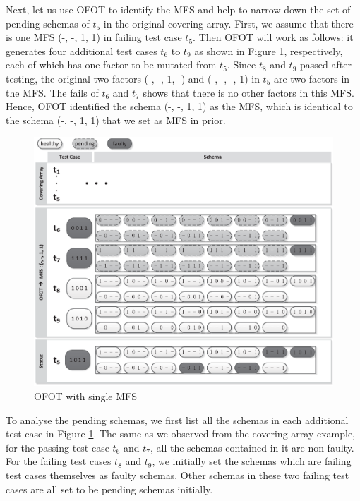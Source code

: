 Next, let us use OFOT to identify the MFS and help to narrow down the set of pending schemas of $t_{5}$ in the original covering array. First, we assume that there is one MFS (-, -, 1, 1) in failing test case $t_{5}$.  Then OFOT will work as follows: it generates four additional test cases $t_{6}$ to $t_{9}$ as shown in Figure \ref{fig_ofot_single}, respectively, each of which has one factor to be mutated from $t_{5}$.  Since $t_{8}$ and $t_{9}$ passed after testing, the original two factors (-, -, 1, -) and (-, -, -, 1) in $t_{5}$ are two factors in the MFS. The fails of $t_{6}$ and $t_{7}$ shows that there is no other factors in this MFS. Hence, OFOT identified the schema (-, -, 1, 1) as the MFS, which is identical to the schema (-, -, 1, 1) that we set as MFS in prior.

\begin{figure}[ht]
 \centering
 \includegraphics[width=5.6in]{ofot_single.eps}
 \caption{OFOT with single MFS}
 \label{fig_ofot_single}
\end{figure}

To analyse the pending schemas, we first list all the schemas in each additional test case in Figure \ref{fig_ofot_single}. The same as we observed from the covering array example, for the passing test case $t_{6}$ and $t_{7}$, all the schemas contained in it are non-faulty. For the failing test cases $t_{8}$ and $t_{9}$, we initially set the schemas which are failing test cases themselves as faulty schemas. Other schemas in these two failing test cases are all set to be pending schemas initially.

